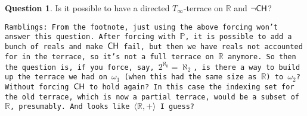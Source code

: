 \documentclass{amsart}
\theoremstyle{definition}
\newtheorem{question}[theorem]{Question}
\theoremstyle{remark}
\renewcommand{\P}{\mathbb{P}}
\newcommand{\R}{\mathbb{R}}
\newcommand{\CH}{\textup{\textsf{CH}}}
\begin{document}
\begin{question} Is it possible to have a directed $T_\infty$-terrace on $\R$ and $\neg \CH$? \end{question}
\texttt{Ramblings: From the footnote, just using the above forcing won't answer this question. After forcing with $\P$, it is possible to add a bunch of reals and make $\CH$ fail, but then we have reals not accounted for in the terrace, so it's not a full terrace on $\R$ anymore. So then the question is, if you force, say, $2^{\aleph_0} = \aleph_2$, is there a way to build up the terrace we had on $\omega_1$ (when this had the same size as $\R$) to $\omega_2$? Without forcing $\CH$ to hold again? In this case the indexing set for the old terrace, which is now a partial terrace, would be a subset of $\R$, presumably. And looks like $\langle \R, + \rangle$ I guess?}				



%
\end{document}
